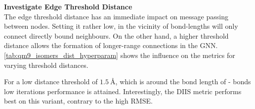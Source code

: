 \textbf{Investigate Edge Threshold Distance}\\
The edge threshold distance has an immediate impact on message passing between nodes. Setting it rather low, in the vicinity of bond-lengths will only connect directly bound neighbours. On the other hand, a higher threshold distance allows the formation of longer-range connections in the GNN. \autoref{tab:qm9_isomers_dist_hyperparam} shows the influence on the metrics for varying threshold distances.  
\begin{table}[h]
    \centering
    \caption[GNN on QM9 isomers with different edge threshold distances]{GNN using different edge threshold distances (numbers denoted in $\unit{\angstrom}$) on QM9  isomers test set. Other hyperparameters are set according to \autoref{tab:init_hparams}}
    \label{tab:qm9_isomers_dist_hyperparam}
\end{table}
For a low distance threshold of $\SI{1.5}{\angstrom}$, which is around the bond length of - bonds low iterations performance is attained. Interestingly, the DIIS metric performs best on this variant, contrary to the high RMSE. 

